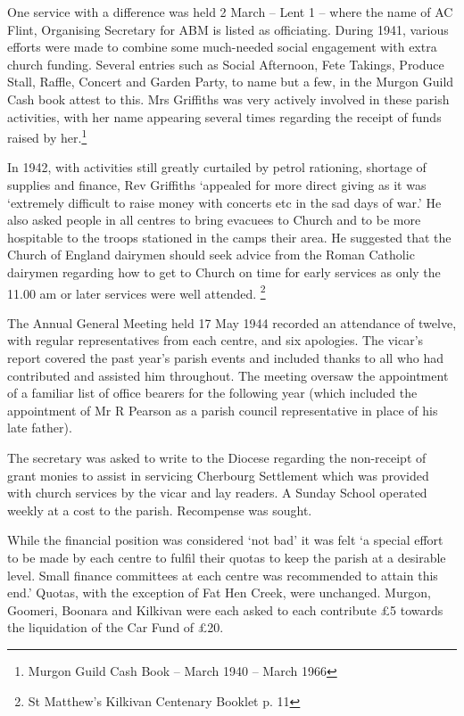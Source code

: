 One service with a difference was held 2 March -- Lent 1 -- where the name of AC Flint, Organising Secretary for ABM is listed as officiating. During 1941, various efforts were made to combine some much-needed social engagement with extra church funding. Several entries such as Social Afternoon, Fete Takings, Produce Stall, Raffle, Concert and Garden Party, to name but a few, in the Murgon Guild Cash book attest to this. Mrs Griffiths was very actively involved in these parish activities, with her name appearing several times regarding the receipt of funds raised by her.\footnote{Murgon Guild Cash Book -- March 1940 -- March 1966}


In 1942, with activities still greatly curtailed by petrol rationing, shortage of supplies and finance, Rev Griffiths `appealed for more direct giving as it was `extremely difficult to raise money with concerts etc in the sad days of war.' He also asked people in all centres to bring evacuees to Church and to be more hospitable to the troops stationed in the camps their area. He suggested that the Church of England dairymen should seek advice from the Roman Catholic dairymen regarding how to get to Church on time for early services as only the 11.00 am or later services were well attended. \footnote{St Matthew's Kilkivan Centenary Booklet p. 11}


The Annual General Meeting held 17 May 1944 recorded an attendance of twelve, with regular representatives from each centre, and six apologies. The vicar's report covered the past year's parish events and included thanks to all who had contributed and assisted him throughout. The meeting oversaw the appointment of a familiar list of office bearers for the following year (which included the appointment of Mr R Pearson as a parish council representative in place of his late father).



The secretary was asked to write to the Diocese regarding the non-receipt of grant monies to assist in servicing Cherbourg Settlement which was provided with church services by the vicar and lay readers. A Sunday School operated weekly at a cost to the parish. Recompense was sought.



While the financial position was considered `not bad' it was felt `a special effort to be made by each centre to fulfil their quotas to keep the parish at a desirable level. Small finance committees at each centre was recommended to attain this end.' Quotas, with the exception of Fat Hen Creek, were unchanged. Murgon, Goomeri, Boonara and Kilkivan were each asked to each contribute \pounds5 towards the liquidation of the Car Fund of \pounds20.



